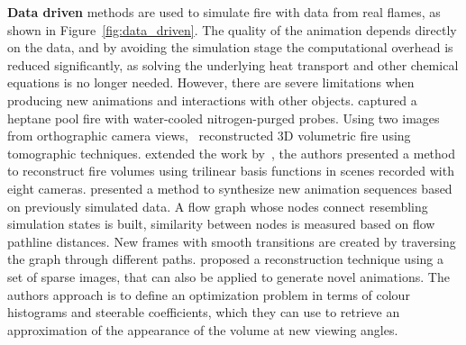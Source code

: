 \textbf{Data driven} methods are used to simulate fire with data from real flames, as shown in Figure~\ref{fig:data_driven}.
The quality of the animation depends directly on the data, and by avoiding the simulation stage the computational overhead is reduced significantly, as solving the underlying heat transport and other chemical equations is no longer needed.
However, there are severe limitations when producing new animations and interactions with other objects.
\cite{Rushmeier:1995} captured a heptane pool fire with water-cooled nitrogen-purged probes.
Using two images from orthographic camera views,~\cite{Hasinoff:2003} reconstructed 3D volumetric fire using tomographic techniques.
\cite{Ihrke:2004} extended the work by~\cite{Hasinoff:2003}, the authors presented a method to reconstruct fire volumes using trilinear basis functions in scenes recorded with eight cameras.
\cite{Zhang:2011} presented a method to synthesize new animation sequences based on previously simulated data.
A flow graph whose nodes connect resembling simulation states is built, similarity between nodes is measured based on flow pathline distances.
New frames with smooth transitions are created by traversing the graph through different paths.
\cite{Okabe:2015} proposed a reconstruction technique using a set of sparse images, that can also be applied to generate novel animations.
The authors approach is to define an optimization problem in terms of colour histograms and steerable coefficients, which they can use to retrieve an approximation of the appearance of the volume at new viewing angles.


